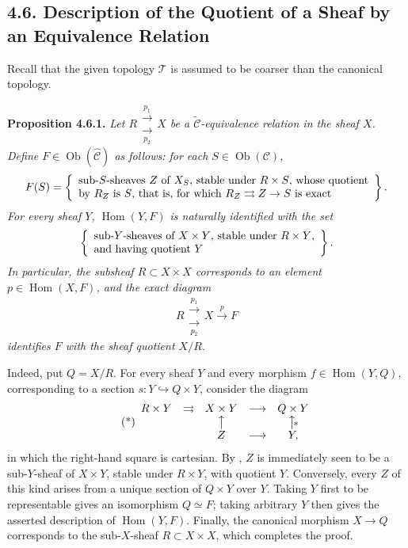 

\subsection*{4.6. Description of the Quotient of a Sheaf by an Equivalence Relation}

Recall that the given topology \(\mathcal T\) is assumed to be coarser than
the canonical topology.

\medskip
\noindent{}\textbf{Proposition 4.6.1.}
\textit{Let
\(
 R \mathrel{\substack{\xrightarrow{\ p_1\ }\\[-0.6ex]
                       \xrightarrow[\ p_2\ ]{}}} X
\)
be a \(\widetilde{\mathscr C}\)-equivalence relation in the sheaf \(X\).
Define \(F\in\operatorname{Ob}(\widehat{\mathscr C})\) as follows: for
each \(S\in\operatorname{Ob}(\mathscr C)\),}
\[
 F(S)=\left\{\begin{array}{l}
 \text{sub-\(S\)-sheaves \(Z\) of \(X_S\), stable under
 \(R\times S\), whose quotient}\cr
 \text{by \(R_Z\) is \(S\), that is, for which
 \(R_Z\rightrightarrows Z\to S\) is exact}
\end{array}\right\}.
\]
\textit{For every sheaf \(Y\), \(\operatorname{Hom}(Y,F)\) is naturally
identified with the set}
\[
 \left\{\begin{array}{l}
 \text{sub-\(Y\)-sheaves of \(X\times Y\), stable under \(R\times Y\),}\cr
 \text{and having quotient \(Y\)}
 \end{array}\right\}.
\]
\textit{In particular, the subsheaf \(R\subset X\times X\) corresponds
to an element \(p\in\operatorname{Hom}(X,F)\), and the exact diagram}
\[
 R\mathrel{\substack{\xrightarrow{\ p_1\ }\\[-0.6ex]
                     \xrightarrow[\ p_2\ ]{}}}X\xrightarrow{p}F
\]
\textit{identifies \(F\) with the sheaf quotient \(X/R\).}

Indeed, put \(Q=X/R\). For every sheaf \(Y\) and every morphism
\(f\in\operatorname{Hom}(Y,Q)\), corresponding to a section
\(s:Y\hookrightarrow Q\times Y\), consider the diagram
\[
\tag{*}\label{sga3:iv:proposition:4:6:1:eq:unnamed:01}
\begin{array}{ccccc}
 R\times Y&\rightrightarrows&X\times Y&\longrightarrow&Q\times Y\cr
 &&\big\uparrow&&\big\uparrow\!{\scriptstyle s}\cr
 &&Z&\longrightarrow&Y,
\end{array}
\]
in which the right-hand square is cartesian. By , \(Z\) is
immediately seen to be a sub-\(Y\)-sheaf of \(X\times Y\), stable under
\(R\times Y\), with quotient \(Y\). Conversely, every \(Z\) of this
kind arises from a unique section of \(Q\times Y\) over \(Y\). Taking
\(Y\) first to be representable gives an isomorphism \(Q\simeq F\);
taking arbitrary \(Y\) then gives the asserted description of
\(\operatorname{Hom}(Y,F)\). Finally, the canonical morphism \(X\to Q\)
corresponds to the sub-\(X\)-sheaf \(R\subset X\times X\), which completes
the proof.

